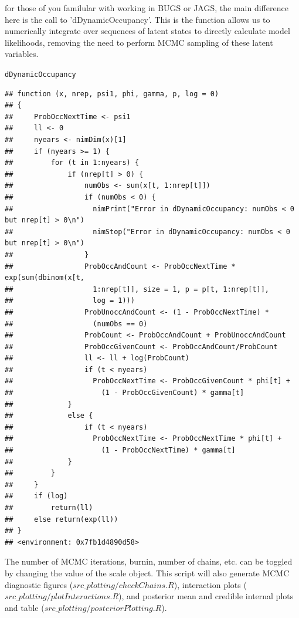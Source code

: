 \documentclass{article}\usepackage[]{graphicx}\usepackage[]{color}
\makeatletter
\newcommand{\hlstd}[1]{\textcolor[rgb]{0.345,0.345,0.345}{#1}}%
\newenvironment{kframe}{%
 \def\at@end@of@kframe{}%
 \ifinner\ifhmode%
  \def\at@end@of@kframe{\end{minipage}}%
  \begin{minipage}{\columnwidth}%
 \fi\fi%
 \def\FrameCommand##1{\hskip\@totalleftmargin \hskip-\fboxsep
 \colorbox{shadecolor}{##1}\hskip-\fboxsep
     \hskip-\linewidth \hskip-\@totalleftmargin \hskip\columnwidth}%
 \MakeFramed {\advance\hsize-\width
   \@totalleftmargin\z@ \linewidth\hsize
   \@setminipage}}%
 {\par\unskip\endMakeFramed%
 \at@end@of@kframe}
\newenvironment{knitrout}{}{} %
\makeatother
\begin{document}
for those of you familular with working in BUGS or JAGS, the main
difference here is the call to 'dDynamicOccupancy'. This is the
function allows us to numerically integrate over sequences of latent
states to directly calculate model likelihoods, removing the need to
perform MCMC sampling of these latent variables.



\begin{knitrout}
\color{fgcolor}\begin{kframe}
\begin{alltt}
\hlstd{dDynamicOccupancy}
\end{alltt}
\begin{verbatim}
## function (x, nrep, psi1, phi, gamma, p, log = 0) 
## {
##     ProbOccNextTime <- psi1
##     ll <- 0
##     nyears <- nimDim(x)[1]
##     if (nyears >= 1) {
##         for (t in 1:nyears) {
##             if (nrep[t] > 0) {
##                 numObs <- sum(x[t, 1:nrep[t]])
##                 if (numObs < 0) {
##                   nimPrint("Error in dDynamicOccupancy: numObs < 0 but nrep[t] > 0\n")
##                   nimStop("Error in dDynamicOccupancy: numObs < 0 but nrep[t] > 0\n")
##                 }
##                 ProbOccAndCount <- ProbOccNextTime * exp(sum(dbinom(x[t, 
##                   1:nrep[t]], size = 1, p = p[t, 1:nrep[t]], 
##                   log = 1)))
##                 ProbUnoccAndCount <- (1 - ProbOccNextTime) * 
##                   (numObs == 0)
##                 ProbCount <- ProbOccAndCount + ProbUnoccAndCount
##                 ProbOccGivenCount <- ProbOccAndCount/ProbCount
##                 ll <- ll + log(ProbCount)
##                 if (t < nyears) 
##                   ProbOccNextTime <- ProbOccGivenCount * phi[t] + 
##                     (1 - ProbOccGivenCount) * gamma[t]
##             }
##             else {
##                 if (t < nyears) 
##                   ProbOccNextTime <- ProbOccNextTime * phi[t] + 
##                     (1 - ProbOccNextTime) * gamma[t]
##             }
##         }
##     }
##     if (log) 
##         return(ll)
##     else return(exp(ll))
## }
## <environment: 0x7fb1d4890d58>
\end{verbatim}
\end{kframe}
\end{knitrout}

The number of MCMC iterations, burnin, number of chains, etc. can be
toggled by changing the value of the scale object. This script will
also generate MCMC diagnostic figures ($src\_plotting/checkChains.R$),
interaction plots ($src\_plotting/plotInteractions.R$), and posterior
mean and credible internal plots and table ($src\_plotting/posteriorPlotting.R$).
\end{document}
